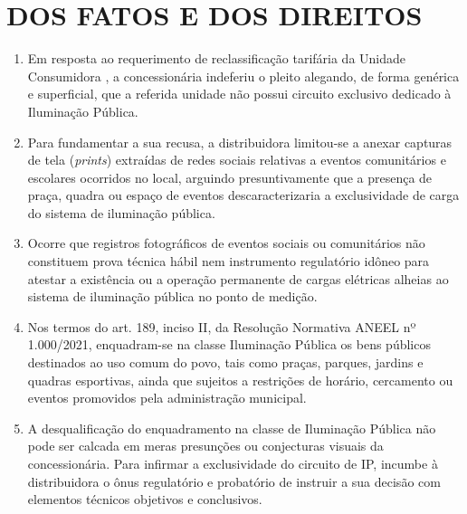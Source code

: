 \newcommand{\tipoRequerimento}{Contestação de Indeferimento por Ausência de Prova Técnica da Carga}


\section{DOS FATOS E DOS DIREITOS}

\begin{enumerate}[resume]
    \item Em resposta ao requerimento de reclassificação tarifária da Unidade Consumidora \unidadeConsumidora{}, a concessionária \nomeConcessionaria{} indeferiu o pleito alegando, de forma genérica e superficial, que a referida unidade não possui circuito exclusivo dedicado à Iluminação Pública.

    \item Para fundamentar a sua recusa, a distribuidora limitou-se a anexar capturas de tela (\textit{prints}) extraídas de redes sociais relativas a eventos comunitários e escolares ocorridos no local, arguindo presuntivamente que a presença de praça, quadra ou espaço de eventos descaracterizaria a exclusividade de carga do sistema de iluminação pública.

    \item Ocorre que registros fotográficos de eventos sociais ou comunitários não constituem prova técnica hábil nem instrumento regulatório idôneo para atestar a existência ou a operação permanente de cargas elétricas alheias ao sistema de iluminação pública no ponto de medição.

    \item Nos termos do art. 189, inciso II, da Resolução Normativa ANEEL nº 1.000/2021, enquadram-se na classe Iluminação Pública os bens públicos destinados ao uso comum do povo, tais como praças, parques, jardins e quadras esportivas, ainda que sujeitos a restrições de horário, cercamento ou eventos promovidos pela administração municipal.

    \item A desqualificação do enquadramento na classe de Iluminação Pública não pode ser calcada em meras presunções ou conjecturas visuais da concessionária. Para infirmar a exclusividade do circuito de IP, incumbe à distribuidora o ônus regulatório e probatório de instruir a sua decisão com elementos técnicos objetivos e conclusivos.


\end{enumerate}
